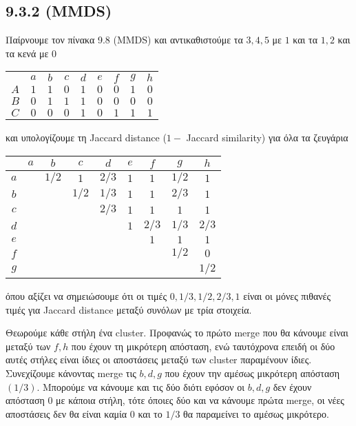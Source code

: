 \documentclass[a4paper,11pt]{article}
\begin{document}
\subsection*{9.3.2 (MMDS)}

Παίρνουμε τον πίνακα 9.8 (MMDS) και αντικαθιστούμε τα $3,4,5$ με $1$ και τα $1,2$ και τα κενά με 0
\begin{center}
	\begin{tabular}{| c || c | c | c | c | c | c | c | c |}
		\hline
		& $a$ & $b$ & $c$ & $d$ & $e$ & $f$ & $g$ & $h$ \\ \hhline{|=#=|=|=|=|=|=|=|=|}
		$A$ & $1$ & $1$ & $0$ & $1$ & $0$ & $0$ & $1$ & $0$ \\ \hline
		$B$ & $0$ & $1$ & $1$ & $1$ & $0$ & $0$ & $0$ & $0$ \\ \hline
		$C$ & $0$ & $0$ & $0$ & $1$ & $0$ & $1$ & $1$ & $1$ \\ \hline
	\end{tabular}
\end{center}
και υπολογίζουμε τη Jaccard distance ($1-$ Jaccard similarity) για όλα τα ζευγάρια
\begin{center}
	\begin{tabular}{c | c c c c c c c c}
		& $a$ & $b$ & $c$ & $d$ & $e$ & $f$ & $g$ & $h$ \\ \hline
		$a$ & & $1/2$ & $1$ & $2/3$ & $1$ & $1$ & $1/2$ & $1$ \\
		$b$ & & & $1/2$ & $1/3$ & $1$ & $1$ & $2/3$ & $1$ \\
		$c$ & & & & $2/3$ & $1$ & $1$ & $1$ & $1$ \\
		$d$ & & & & & $1$ & $2/3$ & $1/3$ & $2/3$ \\
		$e$ & & & & & & $1$ & $1$ & $1$ \\
		$f$ & & & & & & & $1/2$ & $0$ \\
		$g$ & & & & & & & & $1/2$ \\
	\end{tabular}
\end{center}
όπου αξίζει να σημειώσουμε ότι οι τιμές $0,1/3,1/2,2/3,1$ είναι οι μόνες πιθανές τιμές για Jaccard distance μεταξύ συνόλων με τρία στοιχεία.

Θεωρούμε κάθε στήλη ένα cluster.
Προφανώς το πρώτο merge που θα κάνουμε είναι μεταξύ των $f,h$ που έχουν τη μικρότερη απόσταση, ενώ ταυτόχρονα επειδή οι δύο αυτές στήλες είναι ίδιες οι αποστάσεις μεταξύ των cluster παραμένουν ίδιες.
Συνεχίζουμε κάνοντας merge τις $b,d,g$ που έχουν την αμέσως μικρότερη απόσταση $(1/3)$.
Μπορούμε να κάνουμε και τις δύο διότι εφόσον οι $b,d,g$ δεν έχουν απόσταση $0$ με κάποια στήλη, τότε όποιες δύο και να κάνουμε πρώτα merge, οι νέες αποστάσεις δεν θα είναι καμία $0$ και το $1/3$ θα παραμείνει το αμέσως μικρότερο.
\end{document}
